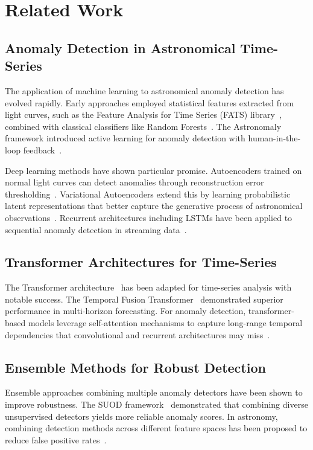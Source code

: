 \documentclass[conference]{IEEEtran}
\begin{document}
\section{Related Work}
\label{sec:related}

\subsection{Anomaly Detection in Astronomical Time-Series}

The application of machine learning to astronomical anomaly detection has evolved rapidly. Early approaches employed statistical features extracted from light curves, such as the Feature Analysis for Time Series (FATS) library~\cite{nun2015fats}, combined with classical classifiers like Random Forests~\cite{richards2011machine}. The Astronomaly framework introduced active learning for anomaly detection with human-in-the-loop feedback~\cite{lochner2021astronomaly}.

Deep learning methods have shown particular promise. Autoencoders trained on normal light curves can detect anomalies through reconstruction error thresholding~\cite{malanchev2021anomaly}. Variational Autoencoders extend this by learning probabilistic latent representations that better capture the generative process of astronomical observations~\cite{boone2019avocado}. Recurrent architectures including LSTMs have been applied to sequential anomaly detection in streaming data~\cite{naul2018recurrent}.

\subsection{Transformer Architectures for Time-Series}

The Transformer architecture~\cite{vaswani2017attention} has been adapted for time-series analysis with notable success. The Temporal Fusion Transformer~\cite{lim2021temporal} demonstrated superior performance in multi-horizon forecasting. For anomaly detection, transformer-based models leverage self-attention mechanisms to capture long-range temporal dependencies that convolutional and recurrent architectures may miss~\cite{tuli2022tranad}.

\subsection{Ensemble Methods for Robust Detection}

Ensemble approaches combining multiple anomaly detectors have been shown to improve robustness. The SUOD framework~\cite{zhao2021suod} demonstrated that combining diverse unsupervised detectors yields more reliable anomaly scores. In astronomy, combining detection methods across different feature spaces has been proposed to reduce false positive rates~\cite{pruzhinskaya2019anomaly}.
\end{document}
